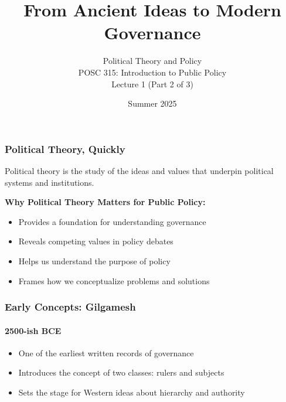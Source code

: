 \documentclass[10pt]{beamer}
\begin{document}
\title{From Ancient Ideas to Modern Governance}
\subtitle{Political Theory and Policy\\POSC 315: Introduction to Public Policy\\Lecture 1 (Part 2 of 3)}
\date{Summer 2025}

\maketitle

\begin{frame}
\frametitle{Political Theory, Quickly}

\begin{block}{}
\centering
Political theory is the study of the ideas and values that underpin political systems and institutions.
\end{block}

\pause
\vspace{0.5cm}
\textbf{Why Political Theory Matters for Public Policy:}
\begin{itemize}
\item Provides a foundation for understanding governance
\item Reveals competing values in policy debates
\item Helps us understand the purpose of policy
\item Frames how we conceptualize problems and solutions
\end{itemize}

\end{frame}

\begin{frame}
\frametitle{Early Concepts: Gilgamesh}
\framesubtitle{2500-ish BCE}

\begin{itemize}
\item<1-> One of the earliest written records of governance
\item<2-> Introduces the concept of two classes: rulers and subjects
\item<3-> Sets the stage for Western ideas about hierarchy and authority
\end{itemize}

\end{frame}
\end{document}

